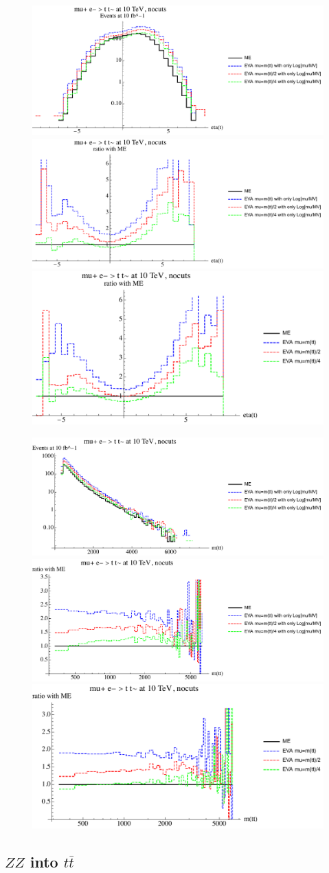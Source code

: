 \documentclass[a4paper,11pt]{article}
\begin{document}
\begin{figure}[ht]
\includegraphics[width=0.4\linewidth]{PlotDistr/WW_tt/10TeVnocuts/plotetat.pdf}
\includegraphics[width=0.4\linewidth]{PlotDistr/WW_tt/10TeVnocuts/plotetatratio1.pdf}
\includegraphics[width=0.4\linewidth]{PlotDistr/WW_tt/10TeVnocuts/plotetatratio2.pdf}
\end{figure}

\begin{figure}[ht]
\includegraphics[width=0.4\linewidth]{PlotDistr/WW_tt/10TeVnocuts/plotmtt.pdf}
\includegraphics[width=0.4\linewidth]{PlotDistr/WW_tt/10TeVnocuts/plotmttratio1.pdf}
\includegraphics[width=0.4\linewidth]{PlotDistr/WW_tt/10TeVnocuts/plotmttratio2.pdf}
\end{figure}

\clearpage
\subsection{$ZZ$ into $t \bar t$}
\end{document}

